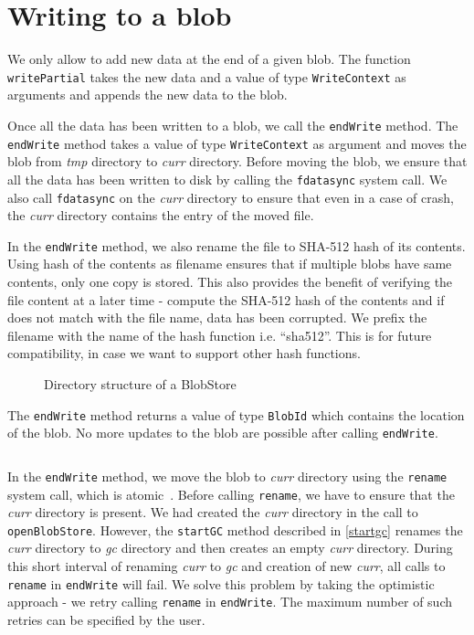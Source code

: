 \section{Writing to a blob}
We only allow to add new data at the end of a given blob. The function \texttt{writePartial} takes the new data and a value of type \texttt{WriteContext} as arguments and appends the new data to the blob.

Once all the data has been written to a blob, we call the \texttt{endWrite} method. The \texttt{endWrite} method takes a value of type \texttt{WriteContext} as argument and moves the blob from \textit{tmp} directory to \textit{curr} directory. Before moving the blob, we ensure that all the data has been written to disk by calling the \texttt{fdatasync} system call.
We also call \texttt{fdatasync} on the \textit{curr} directory to ensure that even in a case of crash, the \textit{curr} directory contains the entry of the moved file.

In the \texttt{endWrite} method, we also rename the file to SHA-512 hash of its contents. Using hash of the contents as filename ensures that if multiple blobs have same contents, only one copy is stored. This also provides the benefit of verifying the file content at a later time - compute the SHA-512 hash of the contents and if does not match with the file name, data has been corrupted.
We prefix the filename with the name of the hash function i.e. ``sha512''. This is for future compatibility, in case we want to support other hash functions.

\begin{figure}[hbt]
  \caption{Directory structure of a BlobStore}
  \label{fig:blobstore-dirstructure}
\end{figure}

The \texttt{endWrite} method returns a value of type \texttt{BlobId} which contains the location of the blob. No more updates to the blob are possible after calling \texttt{endWrite}.

\begin{program}
  \caption{Definition of BlobId}
  \label{prog:defblobid}
  \inputminted{haskell}{hs/blobid.hs}
\end{program}

In the \texttt{endWrite} method, we move the blob to \textit{curr} directory using the \texttt{rename} system call, which is atomic~\cite{renamemanpage}. Before calling \texttt{rename}, we have to ensure that the \textit{curr} directory is present. We had created the \textit{curr} directory in the call to \texttt{openBlobStore}.
However, the \texttt{startGC} method described in \ref{startgc} renames the \textit{curr} directory to \textit{gc} directory and then creates an empty \textit{curr} directory. During this short interval of renaming \textit{curr} to \textit{gc} and creation of new \textit{curr}, all calls to \texttt{rename} in \texttt{endWrite} will fail.
We solve this problem by taking the optimistic approach - we retry calling \texttt{rename} in \texttt{endWrite}. The maximum number of such retries can be specified by the user.

